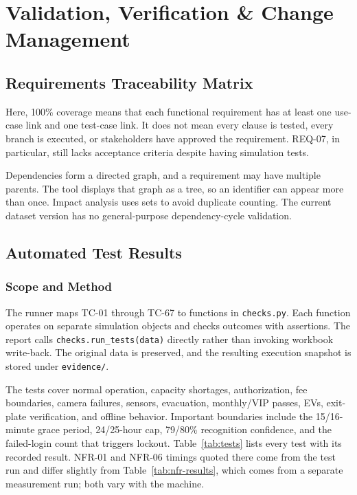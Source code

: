 \chapter{Validation, Verification \& Change Management}
\section{Requirements Traceability Matrix}


Here, 100\% coverage means that each functional requirement has at least one use-case link and one test-case link. It does not mean every clause is tested, every branch is executed, or stakeholders have approved the requirement. REQ-07, in particular, still lacks acceptance criteria despite having simulation tests.

Dependencies form a directed graph, and a requirement may have multiple parents. The tool displays that graph as a tree, so an identifier can appear more than once. Impact analysis uses sets to avoid duplicate counting. The current dataset version has no general-purpose dependency-cycle validation.

\section{Automated Test Results}
\subsection{Scope and Method}
The runner maps TC-01 through TC-67 to functions in \texttt{checks.py}. Each function operates on separate simulation objects and checks outcomes with assertions. The report calls \texttt{checks.run\_tests(data)} directly rather than invoking workbook write-back. The original data is preserved, and the resulting execution snapshot is stored under \texttt{evidence/}.

The tests cover normal operation, capacity shortages, authorization, fee boundaries, camera failures, sensors, evacuation, monthly/VIP passes, EVs, exit-plate verification, and offline behavior. Important boundaries include the 15/16-minute grace period, 24/25-hour cap, 79/80\% recognition confidence, and the failed-login count that triggers lockout.
Table~\ref{tab:tests} lists every test with its recorded result. NFR-01 and NFR-06 timings quoted there come from the test run and differ slightly from Table~\ref{tab:nfr-results}, which comes from a separate measurement run; both vary with the machine.


